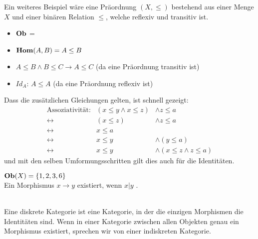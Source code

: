 \documentclass{article}
\renewcommand{\id}{\ensuremath{Id}}
\begin{document}
		 \begin{bsp}
		 Ein weiteres Beispiel w\"are eine Pr\"aordnung \( \left( X, \leq \right) \) bestehend aus einer Menge \( X \) und einer bin\"aren Relation \( \leq \), welche reflexiv und transitiv ist.
		 
		 \begin{itemize}
			 \item \( \mathbf{Ob}  \) = \BN
			 \item \(   \mathbf{Hom } (A,B) = A \leq B \)
			 \item \( A \leq B \wedge B \leq  C \rightarrow A \leq C \)  (da eine Pr\"aordnung transitiv ist) 
			 \item \( \id_A \): \( A \leq A \) (da eine  Pr\"aordnung reflexiv ist)
		 \end{itemize}
			 Dass die zus\"atzlichen Gleichungen gelten, ist schnell gezeigt:
			 \begin{eqnarray*}
			  \text{Assoziativit\"at:} &  ( x \leq y \wedge x \leq z ) & \wedge z \leq a \\
					 \leftrightarrow & (x \leq z ) & \wedge  z \leq a \\
					 \leftrightarrow & x \leq a & \\
					 \leftrightarrow & 	x \leq y  & \wedge  (y \leq a) \\
					 \leftrightarrow &   x \leq y & \wedge  (x \leq z  \wedge  z \leq a )
			 \end{eqnarray*}
			 und mit den selben Umformungsschritten gilt dies auch f\"ur die Identit\"aten.
		\end{bsp}
		
		\begin{bsp}
		
		  \cite[Beispiel 2.2.30]{Bra} 
		 \(  \mathbf{Ob} (X) = \left\lbrace 1,2,3,6 \right\rbrace \) \\
		 Ein Morphismus \(x   \to y \) existiert, wenn \( x \vert y\) . \\
		 
		   

		\end{bsp} 
		 
	 	\begin{defi}
	 	 \cite[Beispiel 2.2.31]{Bra} \\
	 		Eine diskrete Kategorie ist eine Kategorie, in der die einzigen Morphismen die Identit\"aten sind.
	 		Wenn in einer Kategorie zwischen allen Objekten genau ein Morphismus existiert, sprechen wir von einer indiskreten Kategorie.
	 	\end{defi}	
	 		
\end{document}
